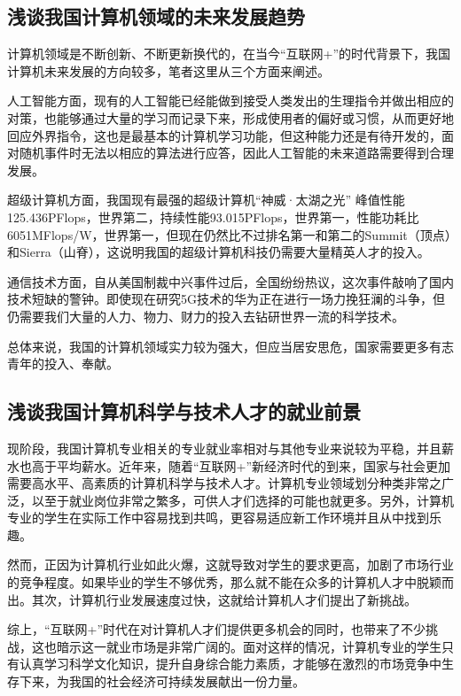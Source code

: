 \documentclass{article}
\begin{document}
\subsection{浅谈我国计算机领域的未来发展趋势}
计算机领域是不断创新、不断更新换代的，在当今“互联网+”的时代背景下，我国计算机未来发展的方向较多，笔者这里从三个方面来阐述。\par
人工智能方面，现有的人工智能已经能做到接受人类发出的生理指令并做出相应的对策，也能够通过大量的学习而记录下来，形成使用者的偏好或习惯，从而更好地回应外界指令，这也是最基本的计算机学习功能，但这种能力还是有待开发的，面对随机事件时无法以相应的算法进行应答，因此人工智能的未来道路需要得到合理发展\citep{yexiong}。\par
超级计算机方面，我国现有最强的超级计算机“神威·太湖之光” 峰值性能125.436PFlops，世界第二，持续性能93.015PFlops，世界第一，性能功耗比6051MFlops/W，世界第一，但现在仍然比不过排名第一和第二的Summit（顶点）和Sierra（山脊），这说明我国的超级计算机科技仍需要大量精英人才的投入。\par
通信技术方面，自从美国制裁中兴事件过后，全国纷纷热议，这次事件敲响了国内技术短缺的警钟。即使现在研究5G技术的华为正在进行一场力挽狂澜的斗争，但仍需要我们大量的人力、物力、财力的投入去钻研世界一流的科学技术。\par
总体来说，我国的计算机领域实力较为强大，但应当居安思危，国家需要更多有志青年的投入、奉献。\par
\subsection{浅谈我国计算机科学与技术人才的就业前景}
现阶段，我国计算机专业相关的专业就业率相对与其他专业来说较为平稳，并且薪水也高于平均薪水。近年来，随着“互联网+”新经济时代的到来，国家与社会更加需要高水平、高素质的计算机科学与技术人才。计算机专业领域划分种类非常之广泛，以至于就业岗位非常之繁多，可供人才们选择的可能也就更多。另外，计算机专业的学生在实际工作中容易找到共鸣，更容易适应新工作环境并且从中找到乐趣。\par
然而，正因为计算机行业如此火爆，这就导致对学生的要求更高，加剧了市场行业的竞争程度。如果毕业的学生不够优秀，那么就不能在众多的计算机人才中脱颖而出。其次，计算机行业发展速度过快，这就给计算机人才们提出了新挑战。\par
综上，“互联网+”时代在对计算机人才们提供更多机会的同时，也带来了不少挑战，这也暗示这一就业市场是非常广阔的。面对这样的情况，计算机专业的学生只有认真学习科学文化知识，提升自身综合能力素质，才能够在激烈的市场竞争中生存下来，为我国的社会经济可持续发展献出一份力量。\par
\end{document}
